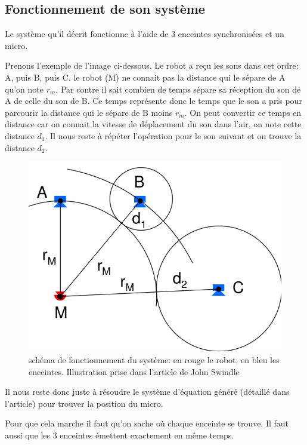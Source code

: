 \documentclass[12pt,a4paper]{report}
\begin{document}
\subsection{Fonctionnement de son système}
Le système qu'il décrit fonctionne à l'aide de 3 enceintes synchronisées et un micro.

Prenons l'exemple de l'image ci-dessous. Le robot a reçu les sons dans cet ordre: A, puis B, puis C.
le robot (M) ne connait pas la distance qui le sépare de A qu'on note $r_{m}$. Par contre il sait combien de temps sépare sa réception du son de A de celle du son de B. Ce temps représente donc le temps que le son a pris pour parcourir la distance qui le sépare de B moins $r_{m}$. On peut convertir ce temps en distance car on connait la vitesse de déplacement du son dans l'air, on note cette distance $d_{1}$. Il nous reste à répéter l'opération pour le son suivant et on trouve la distance $d_{2}$.

\begin{figure}[H]
\includegraphics[width=15cm]{resources/img/fonctionnement_gps.png} 
\caption{schéma de fonctionnement du système: en rouge le robot, en bleu les enceintes. Illustration prise dans l'article de John Swindle\cite{john_swindle2010}}
\end{figure}

Il nous reste donc juste à résoudre le système d'équation généré (détaillé dans l'article\cite{john_swindle2010}) pour trouver la position du micro. 

Pour que cela marche il faut qu'on sache où chaque enceinte se trouve.
Il faut aussi que les 3 enceintes émettent exactement en même temps.
\end{document}
